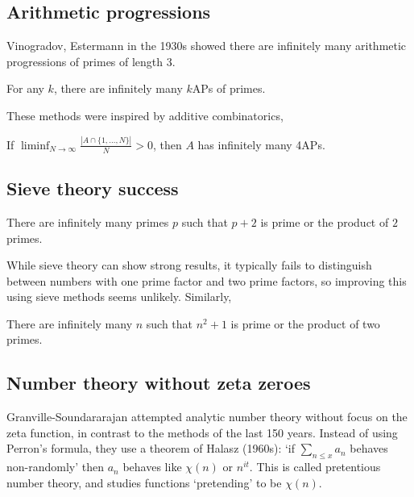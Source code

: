 \documentclass{article}
\newcommand{\1}{\mathbbm{1}}
\begin{document}

\subsection{Arithmetic progressions}
Vinogradov, Estermann in the 1930s showed there are infinitely many arithmetic progressions of primes of length 3.

\begin{thm}
  For any $k$, there are infinitely many $k$APs of primes.
\end{thm}
These methods were inspired by additive combinatorics,
\begin{thm}
  If $\liminf_{N \to \infty} \frac{|A \cap \{1, \dotsc, N\}|}{N} > 0$, then $A$ has infinitely many 4APs.
\end{thm}

\subsection{Sieve theory success}
\begin{thm}[Chen 1973]
  There are infinitely many primes $p$ such that $p+2$ is prime or the product of $2$ primes.
\end{thm}
While sieve theory can show strong results, it typically fails to distinguish between numbers with one prime factor and two prime factors, so improving this using sieve methods seems unlikely. Similarly,
\begin{thm}[Iwaniec 1978]
  There are infinitely many $n$ such that $n^2 +1$ is prime or the product of two primes.
\end{thm}

\subsection{Number theory without zeta zeroes}
Granville-Soundararajan attempted analytic number theory without focus on the zeta function, in contrast to the methods of the last 150 years.
Instead of using Perron's formula, they use a theorem of Halasz (1960s): `if $\sum_{n \leq x} a_n$ behaves non-randomly' then $a_n$ behaves like $\chi(n)$ or $n^{it}$.
This is called pretentious number theory, and studies functions `pretending' to be $\chi(n)$.
\end{document}
